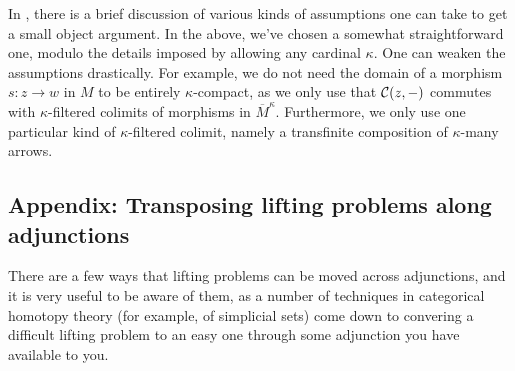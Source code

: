 \begin{remark}
	In \cite[§12.2]{riehl-categorical-homotopy-theory}, there is a brief discussion of various kinds of assumptions one can take to get a small object argument. In the above, we've chosen
	a somewhat straightforward one, modulo the details imposed by allowing any cardinal \(\kappa\). One can weaken the assumptions drastically. For example, we do not need the domain
	of a morphism \(s\!:z\to w\) in \(M\) to be entirely \(\kappa\)-compact, as we only use that \(\mathcal{C}(z,-)\) commutes with \(\kappa\)-filtered colimits of morphisms in \(\overline{M}^\kappa\).
	Furthermore, we only use one particular kind of \(\kappa\)-filtered colimit, namely a transfinite composition of \(\kappa\)-many arrows.
\end{remark}


\subsection{Appendix: Transposing lifting problems along adjunctions}
There are a few ways that lifting problems can be moved across adjunctions, and it is very useful to be aware of them, as a number of techniques in categorical homotopy
theory (for example, of simplicial sets) come down to convering a difficult lifting problem to an easy one through some adjunction you have available to you.

